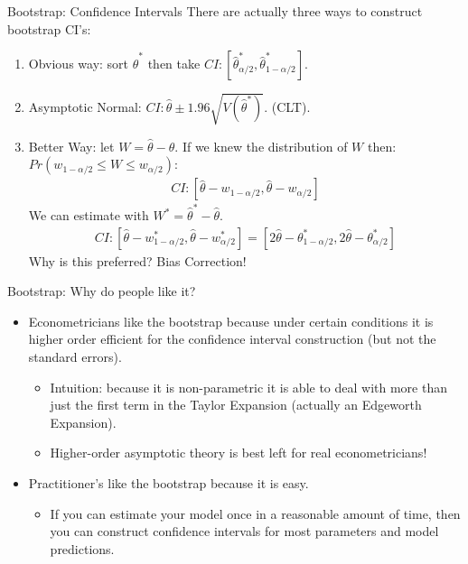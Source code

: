 \documentclass[aspectratio=169]{beamer}
\begin{document}
\begin{frame}{Bootstrap: Confidence Intervals}
There are actually three ways to construct bootstrap CI's:
\begin{enumerate}
\item Obvious way: sort  $\hat{\theta}^{*}$ then take $CI: [\hat{\theta}^{*}_{\alpha/2},\hat{\theta}^{*}_{1-\alpha/2}]$.
\item Asymptotic Normal:  $CI: \hat{\theta} \pm 1.96 \sqrt{V(\hat{\theta}^{*})}$. (CLT).
\item Better Way: let $W= \hat{\theta} -\theta$. If we knew the distribution of $W$ then: $Pr(w_{1-\alpha/2} \leq W \leq w_{\alpha/2})$:
\begin{eqnarray*}
CI: [\hat{\theta} -w_{1-\alpha/2}, \hat{\theta} -w_{\alpha/2}]
\end{eqnarray*}
We can estimate with $W^{*} = \hat{\theta}^{*} - \hat{\theta}$.
\begin{eqnarray*}
CI: [\hat{\theta} -w^*_{1-\alpha/2}, \hat{\theta} -w^*_{\alpha/2}] = [2 \hat{\theta} -\theta^*_{1-\alpha/2}, 2 \hat{\theta} -\theta^*_{\alpha/2}]
\end{eqnarray*}
Why is this preferred? Bias Correction!
\end{enumerate}

\end{frame}


\begin{frame}{Bootstrap: Why do people like it?}
\begin{itemize}
\item Econometricians like the bootstrap because under certain conditions it is \alert{higher order efficient} for the confidence interval construction (but not the standard errors).
\begin{itemize}
\item Intuition: because it is non-parametric it is able to deal with more than just the first term in the Taylor Expansion (actually an \alert{Edgeworth Expansion}).
\item Higher-order asymptotic theory is best left for real econometricians!
\end{itemize}
\item Practitioner's like the bootstrap because it is easy.
\begin{itemize}
\item If you can estimate your model once in a reasonable amount of time, then you can construct confidence intervals for most parameters and model predictions.
\end{itemize}
\end{itemize}
\end{frame}
\end{document}
